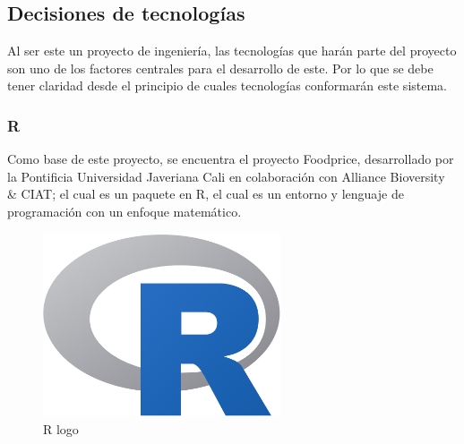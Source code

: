 \subsection{Decisiones de tecnolog\'ias}
\noindent Al ser este un proyecto de ingenier\'ia, las tecnolog\'ias que har\'an parte del proyecto son uno de los factores centrales para el desarrollo de este. Por lo que se debe tener claridad   desde el principio de cuales tecnolog\'ias conformar\'an este sistema.

\subsubsection{R}

\noindent Como base de este proyecto, se encuentra el proyecto Foodprice, desarrollado por la Pontificia Universidad Javeriana Cali en colaboraci\'on con Alliance Bioversity \& CIAT; el cual es un paquete en R, el cual es un entorno y lenguaje de programaci\'on con un enfoque matem\'atico\cite{ProjectStatisticalComputing}.

\begin{figure}[H]
        \centering
        \includegraphics[width=7cm]{img/metodologia/R_logo.svg.png}
        \caption{R logo}
        \label{fig:logoR}
    \end{figure}

